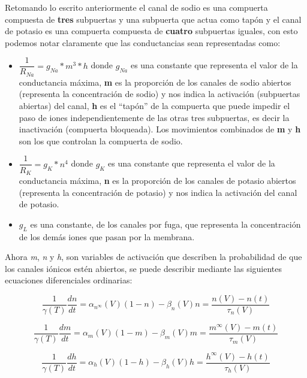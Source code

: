 Retomando lo escrito anteriormente el canal de sodio es una compuerta compuesta de \textbf{tres} subpuertas y una subpuerta que actua como tapón y el canal de potasio es una compuerta compuesta de \textbf{cuatro} subpuertas iguales, \hypertarget{secc} {con esto podemos notar claramente que las conductancias sean representadas como}:

\begin{itemize}
 \item \(\dfrac{1}{R_{Na}} = g_{Na} * m ^3 * h \) donde \(g_{Na}\) es una constante que representa el valor de la conductancia máxima, \textbf{m} es la proporción de los canales de sodio abiertos (representa la concentración de sodio) y nos indica la activación (subpuertas abiertas) del canal, \textbf{h} es el “tapón” de la compuerta que puede impedir el paso de iones independientemente de las otras tres subpuertas, es decir la inactivación (compuerta bloqueada).
Los movimientos combinados de \textbf{m} y \textbf{h} son los que controlan la compuerta de sodio.
 \item \(\dfrac{1}{R_{K}} = g_{K} * n^4\) donde \(g_{K}\) es una constante que representa el valor de la conductancia máxima, \textbf{n} es la proporción de los canales de potasio abiertos (representa la concentración de potasio) y nos indica la activación del canal de potasio.
 \item \(g_{L}\) es una constante, de los canales por fuga, que representa la concentración de los demás iones que pasan por la membrana.
\end{itemize}

Ahora \emph{m}, \emph{n} y \emph{h}, son variables de activación que describen la probabilidad de que los canales iónicos estén abiertos, se puede describir mediante las siguientes ecuaciones diferenciales ordinarias:

\begin{equation}
  \dfrac{1}{\gamma(T)}\dfrac{dn}{dt} =  \alpha_{n^\infty} (V)(1 - n) - \beta_{n} (V) n = \dfrac{n(V)-n(t)}{\tau_{n}(V)}
  \label{eq:corrientesEnLaMembrana3}
\end{equation}

\begin{equation}
  \dfrac{1}{\gamma(T)}\dfrac{dm}{dt} =  \alpha_{m} (V)(1 - m) - \beta_{m} (V) m = \dfrac{m^\infty(V)-m(t)}{\tau_{m}(V)}
  \label{eq:corrientesEnLaMembrana4}
\end{equation}

\begin{equation}
  \dfrac{1}{\gamma(T)}\dfrac{dh}{dt} =  \alpha_{h} (V)(1 - h) - \beta_{h} (V) h = \dfrac{h^\infty(V)-h(t)}{\tau_{h}(V)}
  \label{eq:corrientesEnLaMembrana5}
\end{equation}

